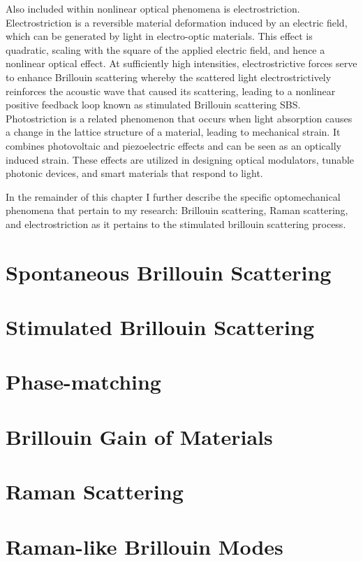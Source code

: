 Also included within nonlinear optical phenomena is electrostriction. Electrostriction is a reversible material deformation induced by an electric field, which can be generated by light in electro-optic materials. This effect is quadratic, scaling with the square of the applied electric field, and hence a nonlinear optical effect. At sufficiently high intensities, electrostrictive forces serve to enhance Brillouin scattering whereby the scattered light electrostrictively reinforces the acoustic wave that caused its scattering, leading to a nonlinear positive feedback loop known as stimulated Brillouin scattering \ac{SBS}. Photostriction is a related phenomenon that occurs when light absorption causes a change in the lattice structure of a material, leading to mechanical strain. It combines photovoltaic and piezoelectric effects and can be seen as an optically induced strain. These effects are utilized in designing optical modulators\cite{}, tunable photonic devices\cite{}, and smart materials that respond to light\cite{}.

In the remainder of this chapter I further describe the specific optomechanical phenomena that pertain to my research: Brillouin scattering, Raman scattering, and electrostriction as it pertains to the stimulated brillouin scattering process.


\section{Spontaneous Brillouin Scattering}
\label{sec:Introduction:Spontaneous}
\lipsum[1]

\section{Stimulated Brillouin Scattering}
\label{sec:Introduction:Stimulated}
\lipsum[1]

\section{Phase-matching}
\label{sec:Introduction:Phase-matching}
\lipsum[1]

\section{Brillouin Gain of Materials}
\label{subsec:Introduction:Gain}
\lipsum[1]

\section{Raman Scattering}
\label{sec:Introduction:Raman}
\lipsum[1]

\section{Raman-like Brillouin Modes}
\label{sec:Introduction:Raman-like}
\lipsum[1]
